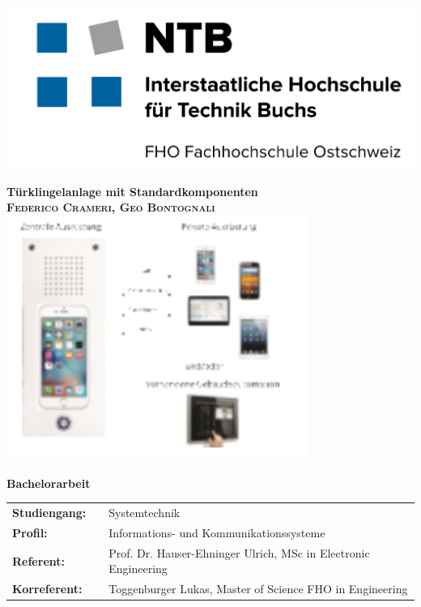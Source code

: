 \begin{titlepage}


	\begin{flushleft}
		\includegraphics[scale=0.1]{image/ntb.jpg}
	\end{flushleft}
	
    \begin{center}
	    \vspace{1cm}
	    \Huge \textbf{\textsf{Türklingelanlage mit Standardkomponenten}} \\
		\vspace{1cm}
		\large\textbf{\textsc{Federico Crameri, Geo Bontognali}}\\
		
		\vspace{1cm}
	    \includegraphics[height=8cm]{image/Titleimage.png}
	
	    \normalsize
	    \vspace{1cm}
	    \large \textbf{Bachelorarbeit}\\
	    \vspace{1cm}
	
	 \normalsize
	 	{
			\begin{tabular}{lll}
				\textbf{Studiengang:} & & Systemtechnik\\
				\textbf{Profil:} & & Informations- und Kommunikationssysteme\\
				\textbf{Referent:} & & Prof. Dr. Hauser-Ehninger Ulrich, MSc in Electronic Engineering\\
				\textbf{Korreferent:} & & Toggenburger Lukas, Master of Science FHO in Engineering\\
			\end{tabular}
	    }
    \end{center}
\end{titlepage}
